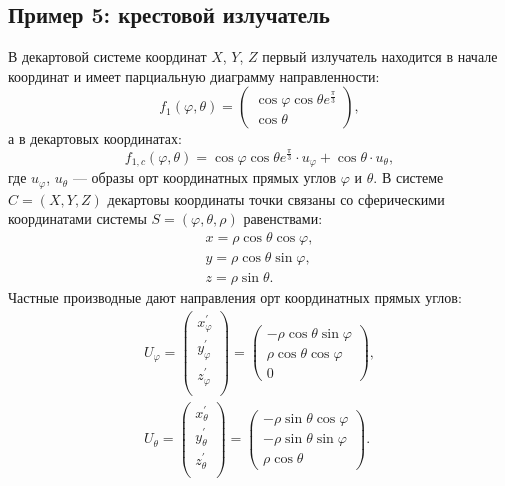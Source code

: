 \subsection{Пример 5: крестовой излучатель}

В декартовой системе координат $X$, $Y$, $Z$ первый излучатель находится в начале координат и имеет парциальную диаграмму направленности:
\[
    f_1(\varphi, \theta) =
    \begin{pmatrix}
        \cos \varphi \cos \theta e^{\frac{\pi}{3}} \\
        \cos \theta
    \end{pmatrix} ,
\]
а в декартовых координатах:
\[
    f_{1,c}(\varphi, \theta) = \cos \varphi \cos \theta e^{\frac{\pi}{3}} \cdot u_{\varphi} + \cos \theta \cdot u_{\theta},
\]
где $u_\varphi$, $u_\theta$ --- образы орт координатных прямых углов $\varphi$ и $\theta$. В системе $C = (X, Y, Z)$ декартовы координаты точки связаны
со сферическими координатами системы $S = (\varphi, \theta, \rho)$ равенствами:
\begin{gather*}
    x = \rho \cos \theta \cos \varphi, \\
    y = \rho \cos \theta \sin \varphi, \\
    z = \rho \sin \theta.
\end{gather*}
Частные производные дают направления орт координатных прямых углов:
\begin{gather*}
    U_{\varphi} =
    \begin{pmatrix}
        x_{\varphi}^{\prime} \\
        y_{\varphi}^{\prime} \\
        z_{\varphi}^{\prime} \\
    \end{pmatrix}
    =
    \begin{pmatrix}
        - \rho \cos \theta \sin \varphi \\
        \rho \cos \theta \cos \varphi   \\
        0
    \end{pmatrix} , \\
    U_{\theta} =
    \begin{pmatrix}
        x_{\theta}^{\prime} \\
        y_{\theta}^{\prime} \\
        z_{\theta}^{\prime} \\
    \end{pmatrix}
    =
    \begin{pmatrix}
        - \rho \sin \theta \cos \varphi \\
        - \rho \sin \theta \sin \varphi \\
        \rho \cos \theta
    \end{pmatrix} .
\end{gather*}
